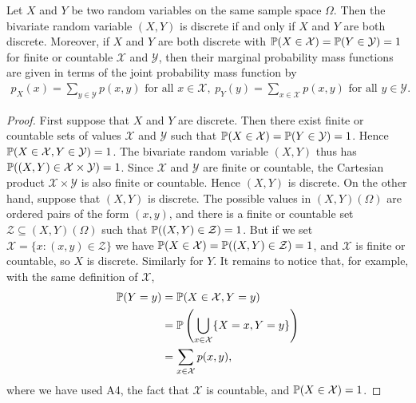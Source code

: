 \documentclass[10pt, a4paper]{article}
\begin{document}
\begin{theorem}
    Let $X$ and $Y$ be two random variables on the same sample space $\Omega$.
    Then the bivariate random variable $(X, Y)$ is discrete if and only if $X$ and $Y$ are both discrete.
    Moreover,
    if $X$ and $Y$ are both discrete with $\P(X \in \mathcal{X}) = \P(Y \in \mathcal{Y}) = 1$ for finite or countable $\mathcal{X}$ and $\mathcal{Y}$,
    then their marginal probability mass functions are given in terms of the joint probability mass function by
    \begin{align*}
        p_X(x) = \sum_{y \in \mathcal{Y}}p(x, y)\text{ for all } x \in \mathcal{X}, & p_Y(y) = \sum_{x \in \mathcal{X}}p(x, y)\text{ for all } y \in \mathcal{Y}.
    \end{align*}
    \begin{proof}
        First suppose that $X$ and $Y$ are discrete.
        Then there exist finite or countable sets of values $\mathcal{X}$ and $\mathcal{Y}$ such that $\P(X \in \mathcal{X}) = \P(Y \in \mathcal{Y}) = 1$.
        Hence $\P(X \in \mathcal{X}, Y \in \mathcal{Y}) = 1$.
        The bivariate random variable $(X, Y)$ thus has $\P((X, Y) \in \mathcal{X} \times \mathcal{Y}) = 1$.
        Since $\mathcal{X}$ and $\mathcal{Y}$ are finite or countable,
        the Cartesian product $\mathcal{X} \times \mathcal{Y}$ is also finite or countable.
        Hence $(X, Y)$ is discrete.
        On the other hand,
        suppose that $(X, Y)$ is discrete.
        The possible values in $(X, Y)(\Omega)$ are ordered pairs of the form $(x, y)$,
        and there is a finite or countable set $\mathcal{Z} \subseteq (X, Y)(\Omega)$ such that $\P((X, Y) \in \mathcal{Z}) = 1$.
        But if we set $\mathcal{X} = \{x : (x, y) \in \mathcal{Z}\}$ we have $\P(X \in \mathcal{X}) = \P((X, Y) \in \mathcal{Z}) = 1$,
        and $\mathcal{X}$ is finite or countable,
        so $X$ is discrete.
        Similarly for $Y$.
        It remains to notice that,
        for example, with the same definition of $\mathcal{X}$,
        \begin{align*}
            \P(Y = y) &= \P(X \in \mathcal{X}, Y = y) \\
            &= \P\left(\bigcup_{x \in \mathcal{X}}\{X = x, Y = y\}\right) \\
            &= \sum_{x \in \mathcal{X}}p(x, y),
        \end{align*}
        where we have used A4,
        the fact that $\mathcal{X}$ is countable,
        and $\P(X \in \mathcal{X}) = 1$.
    \end{proof}
\end{theorem}
\end{document}
